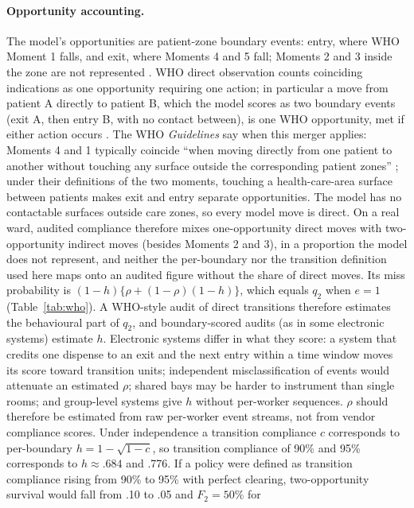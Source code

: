 \paragraph{Opportunity accounting.} The model's opportunities are patient-zone
boundary events: entry, where WHO Moment 1 falls, and exit, where Moments 4 and 5
fall; Moments 2 and 3 inside the zone are not represented \citep{who2009}. WHO
direct observation counts coinciding indications as one opportunity requiring one
action; in particular a move from patient A directly to patient B, which the model
scores as two boundary events (exit A, then entry B, with no contact between), is
one WHO opportunity, met if either action occurs \citep[Sections II.5.6 and
III.5]{who2009}. The WHO \emph{Guidelines} say when this merger applies: Moments 4
and 1 typically coincide ``when moving directly from one patient to another
without touching any surface outside the corresponding patient zones''
\citep[Part I, Section 21.4.2, p.~102]{whoguidelines2009}; under their
definitions of the two moments, touching a health-care-area surface between
patients makes exit and entry separate opportunities.
The model has no contactable surfaces outside care zones, so every model move is
direct. On a real ward, audited compliance therefore mixes one-opportunity direct
moves with two-opportunity indirect moves (besides Moments 2 and 3), in a
proportion the model does not represent, and neither the per-boundary nor the
transition definition used here maps onto an audited figure without the share of
direct moves. Its miss probability is $(1-h)\{\rho+(1-\rho)(1-h)\}$, which
equals $q_2$ when $e=1$ (Table~\ref{tab:who}). A WHO-style audit of direct
transitions therefore estimates the behavioural part of $q_2$, and boundary-scored
audits (as in some electronic systems) estimate $h$. Electronic systems differ in
what they score: a system that credits one dispense to an exit and the next entry
within a time window moves its score toward transition units; independent
misclassification of events would attenuate an estimated $\rho$; shared bays
may be harder to instrument than single rooms; and group-level systems give $h$
without per-worker sequences. $\rho$ should therefore be estimated from raw
per-worker event streams, not from vendor compliance scores. Under independence a
transition compliance $c$ corresponds to per-boundary $h=1-\sqrt{1-c}$, so
transition compliance of 90\% and 95\% corresponds to $h\approx.684$ and .776. If a
policy were defined as transition compliance rising from 90\% to 95\% with perfect
clearing, two-opportunity survival would fall from .10 to .05 and $F_2=50\%$ for
